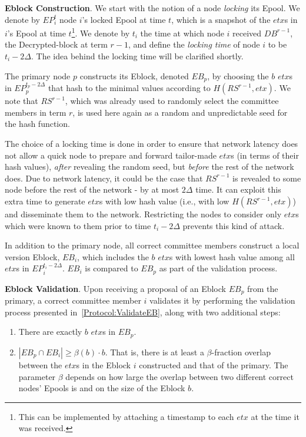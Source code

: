 \textbf{Eblock Construction}. We start with the notion of a node \emph{locking} its Epool. We denote by $EP_i^t$ node $i$'s locked Epool at time $t$, which is a snapshot of the $etx$s in $i$'s Epool at time $t$\footnote{This can be implemented by attaching a timestamp to each $etx$ at the time it was received.}. We denote by $t_i$ the time at which node $i$ received $DB^{r-1}$, the Decrypted-block at term $r-1$, and define the \textit{locking time} of node $i$ to be $t_i-2\Delta$. The idea behind the locking time will be clarified shortly.

The primary node $p$ constructs its Eblock, denoted $EB_p$, by choosing the $b$ $etx$s in $EP_p^{t_p-2\Delta}$ that hash to the minimal values according to $H(RS^{r-1},etx)$. We note that $RS^{r-1}$, which was already used to randomly select the committee members in term $r$, is used here again as a random and unpredictable seed for the hash function. 

The choice of a locking time is done in order to ensure that network latency does not allow a quick node to prepare and forward tailor-made $etx$s (in terms of their hash values), \emph{after} revealing the random seed, but \emph{before} the rest of the network does.  
Due to network latency, it could be the case that $RS^{r-1}$ is revealed to some node before the rest of the network - by at most $2\Delta$ time. It can exploit this extra time to generate $etx$s with low hash value (i.e., with low $H(RS^{r-1},etx)$) and disseminate them to the network. Restricting the nodes to consider only $etx$s which were known to them prior to time $t_i-2\Delta$ prevents this kind of attack. 

In addition to the primary node, all correct committee members construct a local version Eblock, $EB_i$, which includes the $b$ $etx$s with lowest hash value among all $etx$s in $EP_i^{t_i-2\Delta}$. $EB_i$ is compared to $EB_p$ as part of the validation process. 

\textbf{Eblock Validation}. Upon receiving a proposal of an Eblock $EB_p$ from the primary, a correct committee member $i$ validates it by performing the validation process presented in~\ref{Protocol:ValidateEB}, along with two additional steps: 
\begin{enumerate}
\item There are exactly $b$ $etx$s in $EB_p$.
\item $ |EB_p\cap EB_i|\geq  \beta(b) \cdot b$. That is, there is at least a $\beta$-fraction overlap between the $etx$s in the Eblock $i$ constructed and that of the primary. The parameter $\beta$ depends on how large the overlap between two different correct nodes' Epools is and on the size of the Eblock $b$.
\end{enumerate}


